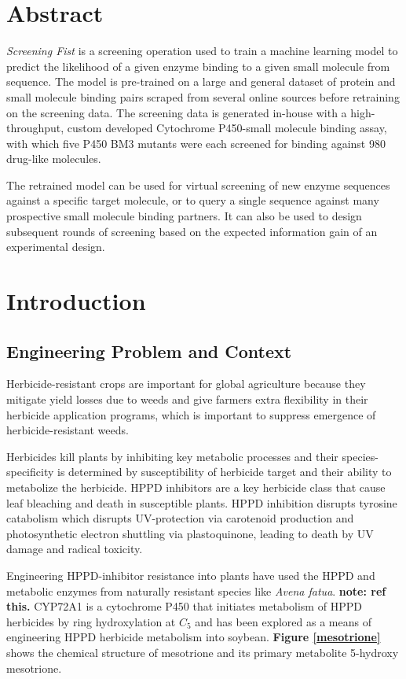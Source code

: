 \documentclass[16pt]{book}
\begin{document}
\section{Abstract}
\textit{Screening Fist} is a screening operation used to train a machine learning model to predict the likelihood of a given enzyme binding to a given small molecule from sequence.
The model is pre-trained on a large and general dataset of protein and small molecule binding pairs scraped from several online sources before retraining on the screening data.
The screening data is generated in-house with a high-throughput, custom developed Cytochrome P450-small molecule binding assay, with which five P450 BM3 mutants were each screened for binding against 980 drug-like molecules.
\par
The retrained model can be used for virtual screening of new enzyme sequences against a specific target molecule, or to query a single sequence against many prospective small molecule binding partners.
It can also be used to design subsequent rounds of screening based on the expected information gain of an experimental design.

\section{Introduction}

\subsection{Engineering Problem and Context}

Herbicide-resistant crops are important for global agriculture because they mitigate yield losses due to weeds and give farmers extra flexibility in their herbicide application programs, which is important to suppress emergence of herbicide-resistant weeds. %
\par
Herbicides kill plants by inhibiting key metabolic processes and their species-specificity is determined by susceptibility of herbicide target and their ability to  metabolize the herbicide. %
HPPD inhibitors are a key herbicide class that cause leaf bleaching and death in susceptible plants. 
HPPD inhibition  disrupts tyrosine catabolism which disrupts UV-protection via carotenoid production and photosynthetic electron shuttling via plastoquinone, leading to death by UV damage and radical toxicity. %
\par
Engineering HPPD-inhibitor resistance into plants have used the HPPD and metabolic enzymes from naturally resistant species like \textit{Avena fatua}. 
\textbf{note: ref this.}
CYP72A1 is a cytochrome P450 that initiates metabolism of HPPD herbicides by ring hydroxylation at $C_5$ and has been explored as a means of engineering HPPD herbicide metabolism into soybean.
\textbf{Figure \ref{mesotrione}} shows the chemical structure of mesotrione and its primary metabolite 5-hydroxy mesotrione. %
\end{document}
